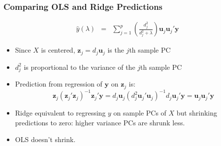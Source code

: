 \begin{frame}
  \frametitle{Comparing OLS and Ridge Predictions}
  \small

  \begin{eqnarray*}
  \widehat{y}(\lambda) &=&
   \sum_{j=1}^p   \left( \frac{d_j^2}{d_j^2 + \lambda} \right)\mathbf{u}_j\mathbf{u}_j'\mathbf{y}
  \end{eqnarray*}

  \begin{itemize}
    \item Since $X$ is centered, $\mathbf{z}_j = d_j\mathbf{u}_j$ is the $j$th sample PC
    \item $d_j^2$ is proportional to the \alert{variance} of the $j$th sample PC
    \item Prediction from regression of $\mathbf{y}$ on $\mathbf{z}_j$ is: 
      \[ \mathbf{z}_j(\mathbf{z}_j'\mathbf{z}_j)^{-1}\mathbf{z}_j' \mathbf{y} = 
        d_j \mathbf{u}_j\left( d_j^2 \mathbf{u}_j' \mathbf{u}_j \right)^{-1} d_j \mathbf{u}_j'\mathbf{y} = \mathbf{u}_j\mathbf{u}_j'\mathbf{y}  
      \]
    \item Ridge equivalent to regressing $y$ on sample PCs of $X$ but shrinking predictions to zero: higher variance PCs are shrunk less.
    \item OLS doesn't shrink.
  \end{itemize}

\end{frame}
